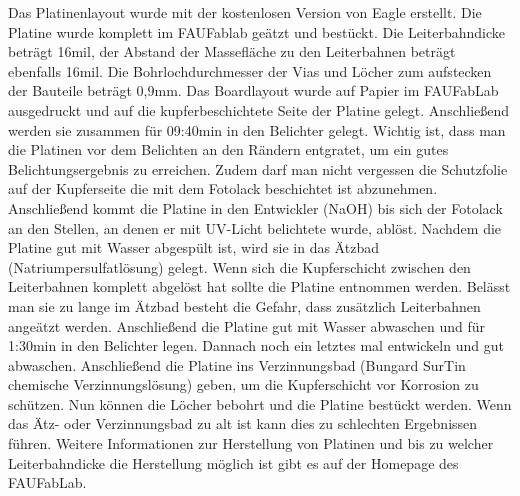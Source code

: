 Das Platinenlayout wurde mit der kostenlosen Version von Eagle erstellt. Die Platine wurde komplett im FAUFablab geätzt und bestückt. Die Leiterbahndicke beträgt 16mil, der Abstand der Massefläche zu den Leiterbahnen beträgt ebenfalls 16mil. Die Bohrlochdurchmesser der Vias und Löcher zum aufstecken der Bauteile beträgt 0,9mm. Das Boardlayout wurde auf Papier im FAUFabLab ausgedruckt und auf die kupferbeschichtete Seite der Platine gelegt. Anschließend werden sie zusammen für 09:40min in den Belichter gelegt.  Wichtig ist, dass man die Platinen vor dem Belichten an den Rändern entgratet, um ein gutes Belichtungsergebnis zu erreichen. Zudem darf man nicht vergessen die Schutzfolie auf der Kupferseite die mit dem Fotolack beschichtet ist abzunehmen. Anschließend kommt die Platine in den Entwickler (NaOH) bis sich der Fotolack an den Stellen, an denen er mit UV-Licht belichtete wurde, ablöst. Nachdem die Platine gut mit Wasser abgespült ist, wird sie in das Ätzbad (Natriumpersulfatlösung) gelegt. Wenn sich die Kupferschicht zwischen den Leiterbahnen komplett abgelöst hat sollte die Platine entnommen werden. Belässt man sie zu lange im Ätzbad besteht die Gefahr, dass zusätzlich Leiterbahnen angeätzt werden. Anschließend die Platine gut mit Wasser abwaschen und für 1:30min in den Belichter legen. Dannach noch ein letztes mal entwickeln und gut abwaschen. Anschließend die Platine ins Verzinnungsbad (Bungard SurTin chemische Verzinnungslösung) geben, um die Kupferschicht vor Korrosion zu schützen. Nun können die Löcher bebohrt und die Platine bestückt werden.
Wenn das Ätz- oder Verzinnungsbad zu alt ist kann dies zu schlechten Ergebnissen führen.
Weitere Informationen zur Herstellung von Platinen und bis zu welcher Leiterbahndicke die Herstellung möglich ist gibt es auf der Homepage des FAUFabLab.